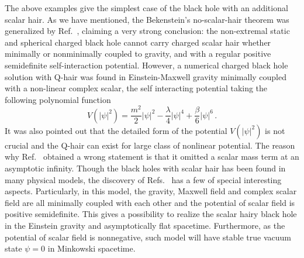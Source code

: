 \documentclass[pr, twocolumn, preprintnumbers, showpacs,footnoteadded, superscriptaddress,nofootinbib,longbibliography]{revtex4-1}
\begin{document}
The above examples give the simplest case of the black hole with an additional scalar hair. As we have mentioned, the Bekenstein's no-scalar-hair theorem was generalized by Ref.~\cite{Mayo:1996mv}, claiming a very strong conclusion: the non-extremal static and spherical charged black hole cannot carry charged scalar hair whether minimally or nonminimally coupled to gravity, and with a regular positive semidefinite self-interaction potential. However, a numerical charged black hole solution with Q-hair was found in Einstein-Maxwell gravity minimally coupled with a non-linear complex scalar, the self interacting potential taking the following polynomial function \cite{Hong:2020miv}
%
\begin{equation}\label{defVs1}
V(|\psi|^2)=\frac{m^2}{2}|\psi|^2-\frac{\lambda}{4}|\psi|^4 + \frac{\beta}{6}|\psi|^6\,.
\end{equation}
%
It was also pointed out that the detailed form of the potential $V(|\psi|^2)$ is not crucial and the Q-hair can exist for large class of nonlinear potential\cite{Hong:2019mcj,Herdeiro:2020xmb}. The reason why Ref.~\cite{Mayo:1996mv} obtained a wrong statement is that it omitted a scalar mass term at an asymptotic infinity. Though the black holes with scalar hair has been found in many physical models, the discovery of Refs.~\cite{Hong:2020miv} has a few of special interesting aspects. Particularly, in this model, the gravity, Maxwell field and complex scalar field are all minimally coupled with each other and the potential of scalar field is positive semidefinite. This gives a possibility to realize the scalar hairy black hole in the Einstein gravity and asymptotically flat spacetime. Furthermore, as the potential of scalar field is nonnegative, such model will have stable true vacuum state $\psi=0$ in Minkowski spacetime.
\end{document}
